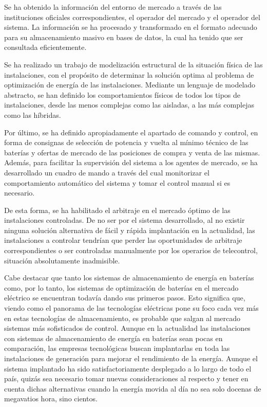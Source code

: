 Se ha obtenido la información del entorno de mercado a través de las instituciones oficiales correspondientes, el operador del mercado y el operador del sistema. La información se ha procesado y transformado en el formato adecuado para su almacenamiento masivo en bases de datos, la cual ha tenido que ser consultada eficientemente.

Se ha realizado un trabajo de modelización estructural de la situación física de las instalaciones, con el propósito de determinar la solución optima al problema de optimización de energía de las instalaciones. Mediante un lenguaje de modelado abstracto, se han definido los comportamientos físicos de todos los tipos de instalaciones, desde las menos complejas como las aisladas, a las más complejas como las híbridas.

Por último, se ha definido apropiadamente el apartado de comando y control, en forma de consignas de selección de potencia y vuelta al mínimo técnico de las baterías y ofertas de mercado de las posiciones de compra y venta de las mismas. Además, para facilitar la supervisión del sistema a los agentes de mercado, se ha desarrollado un cuadro de mando a través del cual monitorizar el comportamiento automático del sistema y tomar el control manual si es necesario.

De esta forma, se ha habilitado el arbitraje en el mercado óptimo de las instalaciones controladas. De no ser por el sistema desarrollado, al no existir ninguna solución alternativa de fácil y rápida implantación en la actualidad, las instalaciones a controlar tendrían que perder las oportunidades de arbitraje correspondientes o ser controladas manualmente por los operarios de telecontrol, situación absolutamente inadmisible.

Cabe destacar que tanto los sistemas de almacenamiento de energía en baterías como, por lo tanto, los sistemas de optimización de baterías en el mercado eléctrico se encuentran todavía dando sus primeros pasos. Esto significa que, viendo como el panorama de las tecnologías eléctricas pone su foco cada vez más en estas tecnologías de almacenamiento, es probable que salgan al mercado sistemas más sofisticados de control. Aunque en la actualidad las instalaciones con sistemas de almacenamiento de energía en baterías sean pocas en comparación, las empresas tecnológicas buscan implantarlas en toda las instalaciones de generación para mejorar el rendimiento de la energía. Aunque el sistema implantado ha sido satisfactoriamente desplegado a lo largo de todo el país, quizás sea necesario tomar nuevas consideraciones al respecto y tener en cuenta dichas alternativas cuando la energía movida al día no sea solo docenas de megavatios hora, sino cientos.


